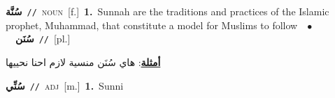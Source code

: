 \documentclass[10pt,a4paper,twoside]{article} %
\begin{document}
\begin{multicols}{2}
{\setlength\topsep{0pt}\textbf{\foreignlanguage{arabic}{سُنَّة}}\ {\color{gray}\texttt{//}\color{black}}\ \textsc{noun}\ [f.]\ \textbf{1.}~Sunnah are the traditions and practices of the Islamic prophet, Muhammad, that constitute a model for Muslims to follow\ \ $\bullet$\ \ \setlength\topsep{0pt}\textbf{\foreignlanguage{arabic}{سُنَن}}\ {\color{gray}\texttt{//}\color{black}}\ [pl.]\  \begin{flushright}\color{gray}\foreignlanguage{arabic}{\textbf{\underline{\foreignlanguage{arabic}{أمثلة}}}: هاي سُنَن منسية لازم احنا نحييها}\end{flushright}\color{black}} \vspace{2mm}

{\setlength\topsep{0pt}\textbf{\foreignlanguage{arabic}{سُنِّي}}\ {\color{gray}\texttt{//}\color{black}}\ \textsc{adj}\ [m.]\ \textbf{1.}~Sunni\ } \vspace{2mm}


\end{multicols}
\end{document}
